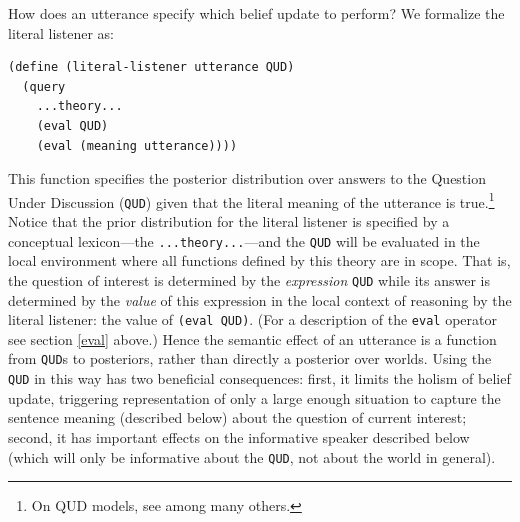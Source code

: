 \documentclass[pdfextras]{handbook}
\begin{document}
How does an utterance specify which belief update to perform? We formalize the literal listener as:
\begin{lstlisting}
(define (literal-listener utterance QUD)
  (query
    ...theory...
    (eval QUD)
    (eval (meaning utterance))))
\end{lstlisting}
This function specifies the posterior distribution over answers to the Question Under Discussion (\lstinline{QUD}) given that the literal meaning of the utterance is true.\footnote{On QUD models, see \citealt{ginzburg95a,van1995discourse,roberts96,beaverclark08} among many others.} 
Notice that the prior distribution for the literal listener is specified by a conceptual lexicon---the \lstinline{...theory...}---and the \lstinline{QUD} will be evaluated in the local environment where all functions defined by this theory are in scope. That is, the question of interest is determined by the \emph{expression} \lstinline{QUD} while its answer is determined by the \emph{value} of this expression in the local context of reasoning by the literal listener: the value of \lstinline{(eval QUD)}. (For a description of the \lstinline{eval} operator see section \ref{eval} above.)
Hence the semantic effect of an utterance is a function from \lstinline{QUD}s to posteriors, rather than directly a posterior over worlds. Using the \lstinline{QUD} in this way has two beneficial consequences: first, it limits the holism of belief update, triggering representation of only a large enough situation to capture the sentence meaning (described below) about the question of current interest; second, it has important effects on the informative speaker described below (which will only be informative about the \lstinline{QUD}, not about the world in general).
\end{document}
